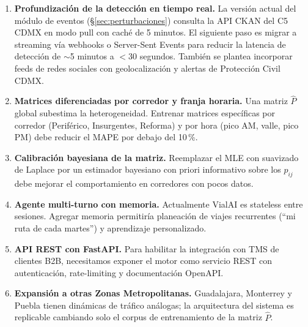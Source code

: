 \documentclass[11pt,a4paper]{article}
\begin{document}
\begin{enumerate}[leftmargin=*]
\item \textbf{Profundización de la detección en tiempo real.} La versión actual del módulo de eventos (§\ref{sec:perturbaciones}) consulta la API CKAN del C5 CDMX en modo pull con caché de 5 minutos. El siguiente paso es migrar a streaming vía webhooks o Server-Sent Events para reducir la latencia de detección de $\sim$5 minutos a $<$30 segundos. También se plantea incorporar feeds de redes sociales con geolocalización y alertas de Protección Civil CDMX.
\item \textbf{Matrices diferenciadas por corredor y franja horaria.} Una matriz $\hat{P}$ global subestima la heterogeneidad. Entrenar matrices específicas por corredor (Periférico, Insurgentes, Reforma) y por hora (pico AM, valle, pico PM) debe reducir el MAPE por debajo del 10\,\%.
\item \textbf{Calibración bayesiana de la matriz.} Reemplazar el MLE con suavizado de Laplace por un estimador bayesiano con priori informativo sobre los $p_{ij}$ debe mejorar el comportamiento en corredores con pocos datos.
\item \textbf{Agente multi-turno con memoria.} Actualmente VialAI es stateless entre sesiones. Agregar memoria permitiría planeación de viajes recurrentes (``mi ruta de cada martes'') y aprendizaje personalizado.
\item \textbf{API REST con FastAPI.} Para habilitar la integración con TMS de clientes B2B, necesitamos exponer el motor como servicio REST con autenticación, rate-limiting y documentación OpenAPI.
\item \textbf{Expansión a otras Zonas Metropolitanas.} Guadalajara, Monterrey y Puebla tienen dinámicas de tráfico análogas; la arquitectura del sistema es replicable cambiando solo el corpus de entrenamiento de la matriz $\hat{P}$.
\end{enumerate}
\end{document}
